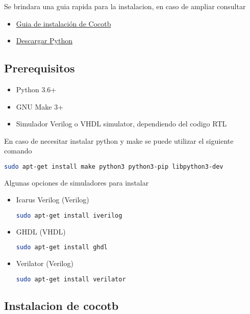 \documentclass[a4paper,12pt]{article}
\begin{document}
Se brindara una guia rapida para la instalacion, en caso de ampliar consultar

\begin{itemize}
	\item \href{https://docs.cocotb.org/en/stable/install.html#install-prerequisites}{Guia de instalación de Cocotb}
	\item \href{https://www.python.org/downloads/}{Descargar Python}
\end{itemize}

\subsection{Prerequisitos}


\begin{itemize}
	\item Python 3.6+
	\item GNU Make 3+
	\item Simulador Verilog o VHDL simulator, dependiendo del codigo RTL
\end{itemize}

En caso de necesitar instalar python y make se puede utilizar el siguiente comando

\begin{lstlisting}[language=bash]
sudo apt-get install make python3 python3-pip libpython3-dev
\end{lstlisting}

Algunas opciones de simuladores para instalar

\begin{itemize}
	
\item Icarus Verilog (Verilog)
\begin{lstlisting}[language=bash]
sudo apt-get install iverilog
\end{lstlisting}

\item GHDL (VHDL)
\begin{lstlisting}[language=bash]
sudo apt-get install ghdl
\end{lstlisting}

\item Verilator (Verilog)
\begin{lstlisting}[language=bash]
sudo apt-get install verilator
\end{lstlisting}
\end{itemize}

\subsection{Instalacion de cocotb}
\end{document}
